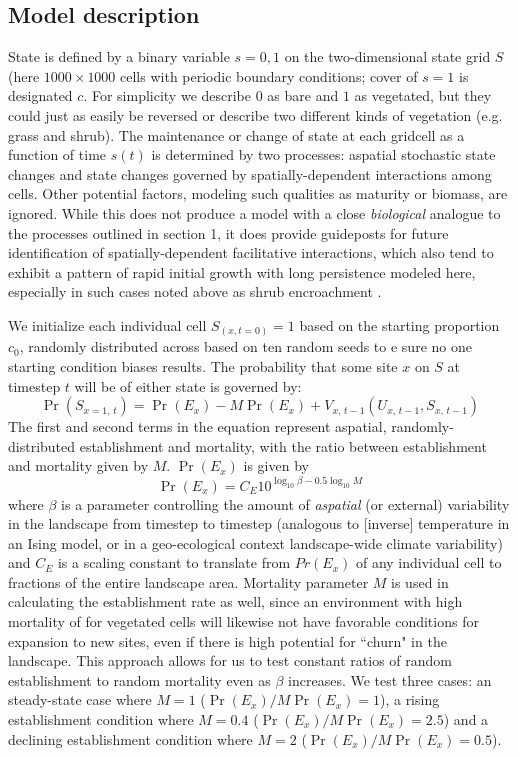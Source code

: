 \documentclass[10pt]{article}
\begin{document}
\begin{linenumbers}
\section{Model description}

State is defined by a binary variable $s = {0, 1}$ on the two-dimensional state grid $S$ (here $1000 \times 1000$ cells with periodic boundary conditions; cover of $s=1$ is designated $c$. For simplicity we describe $0$ as bare and $1$ as vegetated, but they could just as easily be reversed or describe two different kinds of vegetation (e.g. grass and shrub). The maintenance or change of state at each gridcell as a function of time $s(t)$ is determined by two processes: aspatial stochastic state changes and state changes governed by spatially-dependent interactions among cells. Other potential factors, modeling such qualities as maturity or biomass, are ignored. While this does not produce a model with a close \textit{biological} analogue to the processes outlined in section 1, it does provide guideposts for future identification of spatially-dependent facilitative interactions, which also tend to exhibit a pattern of rapid initial growth with long persistence modeled here, especially in such cases noted above as shrub encroachment \citep{WhyBe2016}.

We initialize each individual cell $S_{(x,t=0)}=1$ based on the starting proportion $c_0$, randomly distributed across based on ten random seeds to e sure no one starting condition biases results. The probability that some site $x$ on $S$ at timestep $t$ will be of either state is governed by:
\begin{equation}\Pr(S_{x=1,\,t}) = \Pr(E_x) -  M\Pr(E_x) + V_{x,\,t-1}(U_{x,\,t-1},S_{x,\,t-1})
\end{equation} 
The first and second terms in the equation represent aspatial, randomly-distributed establishment and mortality, with the ratio between establishment and mortality given by $M$. $\Pr(E_x)$ is given by
\begin{equation}
 \Pr(E_x) = C_E 10^{\log_{10}\beta - 0.5 \log_{10}M}
\end{equation}
where $\beta$ is a parameter controlling the amount of \textit{aspatial} (or external) variability in the landscape from timestep to timestep (analogous to [inverse] temperature in an Ising model, or in a geo-ecological context landscape-wide climate variability) and $C_E$ is a scaling constant to translate from $Pr(E_x)$ of any individual cell to fractions of the entire landscape area. Mortality parameter $M$ is used in calculating the establishment rate as well, since an environment with high mortality of for vegetated cells will likewise not have favorable conditions for expansion to new sites, even if there is high potential for ``churn" in the landscape. This approach allows for us to test constant ratios of random establishment to random mortality even as $\beta$ increases. We test three cases: an steady-state case where $M = 1$ ($\Pr(E_x) / M\Pr(E_x) = 1$), a rising establishment condition where $M = 0.4$ ($\Pr(E_x) / M\Pr(E_x)= 2.5$) and a declining establishment condition where  $M = 2$ ($\Pr(E_x) / M\Pr(E_x)= 0.5$).


\end{linenumbers}
\end{document}
